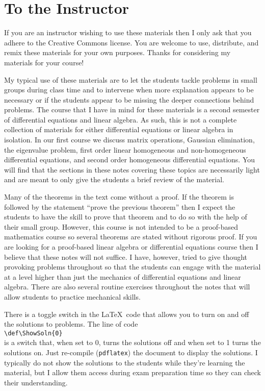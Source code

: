 
\section{To the Instructor}
If you are an instructor wishing to use these materials then I only ask that you adhere to the
Creative Commons license.  You are welcome to use, distribute, and remix these materials
for your own purposes.  Thanks for considering my materials for your course!

My typical use of these materials are to let the students tackle problems in small groups
during class time and to intervene when more explanation appears to be necessary or if
the students appear to be missing the deeper connections behind problems.  The course that
I have in mind for these materials is a second semester of differential equations and
linear algebra.  As such, this is not a complete collection of materials for either
differential equations or linear algebra in isolation.  In our first course we discuss
matrix operations, Gaussian elimination, the eigenvalue problem, first order linear
homogeneous and non-homogeneous differential equations, and second order homogeneous
differential equations.  You will find that the sections in these notes covering these
topics are necessarily light and are meant to only give the students a brief review of the
material.

Many of the theorems in the text come without a proof.  If the theorem is followed by the
statement ``prove the previous theorem'' then I expect the students to have the skill to
prove that theorem and to do so with the help of their small group.  However, this course
is not intended to be a proof-based mathematics course so several theorems are stated
without rigorous proof. If you are looking for a proof-based linear algebra or
differential equations course then I believe that these notes will not suffice.  I have,
however, tried to give thought provoking problems throughout so that the students can
engage with the material at a level higher than just the mechanics of differential
equations and linear algebra.  There are also several routine exercises
throughout the notes that will allow students to practice mechanical skills.

There is a toggle switch in the \LaTeX\ code that
allows you to turn on and off the solutions to problems.  The line of code \\
\verb|\def\ShowSoln{0}|\\
is a switch that, when set to 0, turns the solutions off and when set to 1 turns the
solutions on.  Just re-compile (\texttt{pdflatex}) the document to display the solutions.
I typically do not show the solutions to the students while they're learning the material,
but I allow them access during exam preparation time so they can check their
understanding. 
